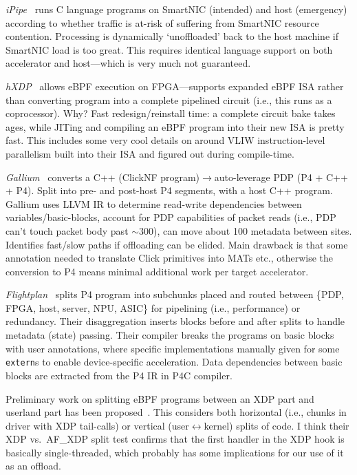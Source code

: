 \emph{iPipe}~\parencite{DBLP:conf/sigcomm/LiuCSKPG19} runs C language programs on SmartNIC (intended) and host (emergency) according to whether traffic is at-risk of suffering from SmartNIC resource contention.
Processing is dynamically `unoffloaded' back to the host machine if SmartNIC load is too great.
This requires identical language support on both accelerator and host---which is very much not guaranteed.

\emph{hXDP}~\parencite{DBLP:conf/osdi/BrunellaBBPSBCP20} allows eBPF execution on FPGA---supports expanded eBPF ISA rather than converting program into a complete pipelined circuit (i.e., this runs as a coprocessor).
Why?
Fast redesign/reinstall time: a complete circuit bake takes ages, while JITing and compiling an eBPF program into their new ISA is pretty fast.
This includes some very cool details on around VLIW instruction-level parallelism built into their ISA and figured out during compile-time.

\emph{Gallium}~\parencite{DBLP:conf/sigcomm/ZhangZK20} converts a C++ (ClickNF program)$\rightarrow$auto-leverage PDP (P4 + C++ + P4).
Split into pre- and post-host P4 segments, with a host C++ program.
Gallium uses LLVM IR to determine read-write dependencies between variables/basic-blocks, account for PDP capabilities of packet reads (i.e., PDP can't touch packet body past $\sim$\qty{300}{\byte}), can move about \qty{100}{\byte} metadata between sites.
Identifies fast/slow paths if offloading can be elided.
Main drawback is that some annotation needed to translate Click primitives into MATs etc., otherwise the conversion to P4 means minimal additional work per target accelerator.

\emph{Flightplan}~\parencite{DBLP:conf/nsdi/SultanaSGPHSBDL21} splits P4 program into subchunks placed and routed between \{PDP, FPGA, host, server, NPU, ASIC\} for pipelining (i.e., performance) or redundancy.
Their disaggregation inserts blocks before and after splits to handle metadata (state) passing.
Their compiler breaks the programs on basic blocks with user annotations, where specific implementations manually given for some \texttt{extern}s to enable device-specific acceleration.
Data dependencies between basic blocks are extracted from the P4 IR in P4C compiler.

Preliminary work on splitting eBPF programs between an XDP part and userland part has been proposed~\parencite{DBLP:conf/conext/ShahinfarMSSBA21}.
This considers both horizontal (i.e., chunks in driver with XDP tail-calls) or vertical (user$\leftrightarrow$kernel) splits of code.
I think their XDP vs.~AF\_XDP split test confirms that the first handler in the XDP hook is basically single-threaded, which probably has some implications for our use of it as an offload.

